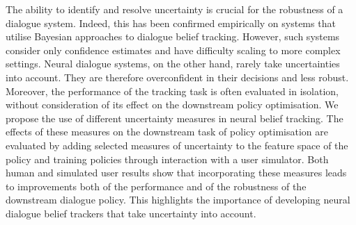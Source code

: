 The ability to identify and resolve uncertainty is crucial for the robustness of a dialogue system. Indeed, this has been confirmed empirically on systems that utilise Bayesian approaches to dialogue belief tracking.  However, such systems consider only confidence estimates and have difficulty scaling to more complex settings.  Neural dialogue systems, on the other hand, rarely take uncertainties into account. They are therefore overconfident in their decisions and less robust.  Moreover, the performance of the tracking task is often evaluated in isolation, without consideration of its effect on the downstream policy optimisation.  We propose the use of different uncertainty measures in neural belief tracking.  The effects of these measures on the downstream task of policy optimisation are evaluated by adding selected measures of uncertainty to the feature space of the policy and training policies through interaction with a user simulator. Both human and simulated user results show that incorporating these measures leads to improvements both of the performance and of the robustness of the downstream dialogue policy. This highlights the importance of developing neural dialogue belief trackers that take uncertainty into account.
